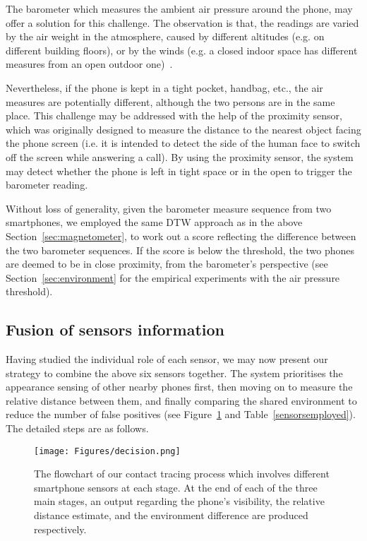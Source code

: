 \documentclass[graybox]{svmult}
\begin{document}
The barometer which measures the ambient air pressure around the phone, may offer a solution for this challenge. The observation is that, the readings are varied by the air weight in the atmosphere, caused by different altitudes (e.g. on different building floors), or by the winds (e.g. a closed indoor space has different measures from an open outdoor one)~\cite{kim2017floor,li2013using,nii2017bar}.

Nevertheless, if the phone is kept in a tight pocket, handbag, etc., the air measures are potentially different, although the two persons are in the same place. This challenge may be addressed with the help of the proximity sensor, which was originally designed to measure the distance to the nearest object facing the phone screen (i.e. it is intended to detect the side of the human face to switch off the screen while answering a call). By using the proximity sensor, the system may detect whether the phone is left in tight space or in the open to trigger the barometer reading.

Without loss of generality, given the barometer measure sequence from two smartphones, we employed the same DTW approach as in the above Section~\ref{sec:magnetometer}, to work out a score reflecting the difference between the two barometer sequences. If the score is below the threshold, the two phones are deemed to be in close proximity, from the barometer's perspective (see Section~\ref{sec:environment} for the empirical experiments with the air pressure threshold).




\subsection{Fusion of sensors information}
Having studied the individual role of each sensor, we may now present our strategy to combine the above six sensors together. The system prioritises the appearance sensing of other nearby phones first, then moving on to measure the relative distance between them, and finally comparing the shared environment to reduce the number of false positives (see Figure~\ref{decision} and Table~\ref{sensorsemployed}). The detailed steps are as follows.
\begin{figure}[h]
    \centering
    \sidecaption
    \texttt{[image: Figures/decision.png]}
    \caption{The flowchart of our contact tracing process which involves different smartphone sensors at each stage. At the end of each of the three main stages, an output regarding the phone's visibility, the relative distance estimate, and the environment difference are produced respectively.}
    \label{decision}
\end{figure}
\end{document}
